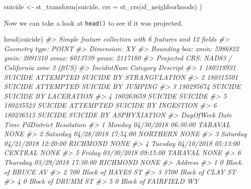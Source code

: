\documentclass[
]{krantz}
\makeatletter
\newenvironment{Shaded}{\begin{snugshade}}{\end{snugshade}}
\newcommand{\AttributeTok}[1]{\textcolor[rgb]{0.61,0.61,0.61}{#1}}
\newcommand{\CommentTok}[1]{\textcolor[rgb]{0.37,0.37,0.37}{\textit{#1}}}
\newcommand{\FunctionTok}[1]{\textcolor[rgb]{0,0,0}{#1}}
\newcommand{\NormalTok}[1]{#1}
\newcommand{\OtherTok}[1]{\textcolor[rgb]{0.37,0.37,0.37}{#1}}
\newenvironment{kframe}{%
\medskip{}
\setlength{\fboxsep}{.8em}
 \def\at@end@of@kframe{}%
 \ifinner\ifhmode%
  \def\at@end@of@kframe{\end{minipage}}%
  \begin{minipage}{\columnwidth}%
 \fi\fi%
 \def\FrameCommand##1{\hskip\@totalleftmargin \hskip-\fboxsep
 \colorbox{shadecolor}{##1}\hskip-\fboxsep
     \hskip-\linewidth \hskip-\@totalleftmargin \hskip\columnwidth}%
 \MakeFramed {\advance\hsize-\width
   \@totalleftmargin\z@ \linewidth\hsize
   \@setminipage}}%
 {\par\unskip\endMakeFramed%
 \at@end@of@kframe}
\renewenvironment{Shaded}{\begin{kframe}}{\end{kframe}}
\makeatother
\begin{document}
\begin{Shaded}
\begin{Highlighting}[]
\NormalTok{suicide }\OtherTok{\textless{}{-}} \FunctionTok{st\_transform}\NormalTok{(suicide,}
  \AttributeTok{crs =} \FunctionTok{st\_crs}\NormalTok{(sf\_neighborhoods)}
\NormalTok{)}
\end{Highlighting}
\end{Shaded}

Now we can take a look at \texttt{head()} to see if it was
projected.

\begin{Shaded}
\begin{Highlighting}[]
\FunctionTok{head}\NormalTok{(suicide)}
\CommentTok{\#\textgreater{} Simple feature collection with 6 features and 12 fields}
\CommentTok{\#\textgreater{} Geometry type: POINT}
\CommentTok{\#\textgreater{} Dimension:     XY}
\CommentTok{\#\textgreater{} Bounding box:  xmin: 5986822 ymin: 2091310 xmax: 6013739 ymax: 2117180}
\CommentTok{\#\textgreater{} Projected CRS: NAD83 / California zone 3 (ftUS)}
\CommentTok{\#\textgreater{}   IncidntNum Category                           Descript}
\CommentTok{\#\textgreater{} 1  180318931  SUICIDE ATTEMPTED SUICIDE BY STRANGULATION}
\CommentTok{\#\textgreater{} 2  180315501  SUICIDE       ATTEMPTED SUICIDE BY JUMPING}
\CommentTok{\#\textgreater{} 3  180295674  SUICIDE              SUICIDE BY LACERATION}
\CommentTok{\#\textgreater{} 4  180263659  SUICIDE                            SUICIDE}
\CommentTok{\#\textgreater{} 5  180235523  SUICIDE     ATTEMPTED SUICIDE BY INGESTION}
\CommentTok{\#\textgreater{} 6  180236515  SUICIDE            SUICIDE BY ASPHYXIATION}
\CommentTok{\#\textgreater{}   DayOfWeek       Date     Time PdDistrict Resolution}
\CommentTok{\#\textgreater{} 1    Monday 04/30/2018 06:30:00    TARAVAL       NONE}
\CommentTok{\#\textgreater{} 2  Saturday 04/28/2018 17:54:00   NORTHERN       NONE}
\CommentTok{\#\textgreater{} 3  Saturday 04/21/2018 12:20:00   RICHMOND       NONE}
\CommentTok{\#\textgreater{} 4   Tuesday 04/10/2018 05:13:00    CENTRAL       NONE}
\CommentTok{\#\textgreater{} 5    Friday 03/30/2018 09:15:00    TARAVAL       NONE}
\CommentTok{\#\textgreater{} 6  Thursday 03/29/2018 17:30:00   RICHMOND       NONE}
\CommentTok{\#\textgreater{}                   Address}
\CommentTok{\#\textgreater{} 1     0 Block of BRUCE AV}
\CommentTok{\#\textgreater{} 2   700 Block of HAYES ST}
\CommentTok{\#\textgreater{} 3   3700 Block of CLAY ST}
\CommentTok{\#\textgreater{} 4     0 Block of DRUMM ST}
\CommentTok{\#\textgreater{} 5 0 Block of FAIRFIELD WY}

\end{Highlighting}
\end{Shaded}
\end{document}
